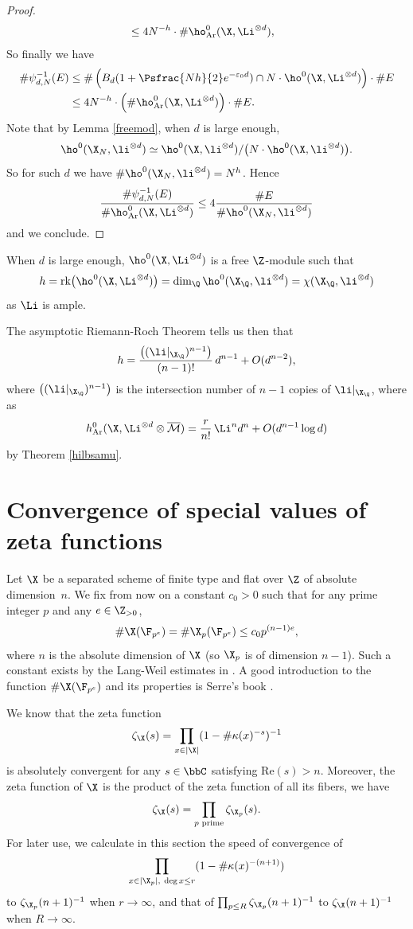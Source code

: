 \begin{proof}[Proof]
\begin{align*}
&\leq 4N^{-h}\cdot \#\ho^0_{\mathrm{Ar}}(\X,\Li^{\otimes d}),
\end{align*}
So finally we have
\begin{align*}
\#\psi_{d,N}^{-1}(E)&\leq \#\left(B_d(1+\Psfrac{Nh}{2}e^{-\varepsilon_0 d}) \cap N\cdot \ho^0(\X,\Li^{\otimes d}) \right)\cdot \#E\\
&\leq 4N^{-h}\cdot \left(\#\ho^0_{\mathrm{Ar}}(\X,\Li^{\otimes d})\right)\cdot \#E.
\end{align*}
Note that by Lemma \ref{freemod}, when $d$ is large enough,
\[
\ho^0(\X_N,\li^{\otimes d})\simeq\ho^0(\X,\li^{\otimes d})/\big(N\cdot \ho^0(\X,\li^{\otimes d})\big).
\]
So for such $d$ we have $\#\ho^0(\X_{N},\li^{\otimes d})=N^{h}$. Hence
\[
\frac{\#\psi_{d,N}^{-1}(E)}{\#\ho^0_{\mathrm{Ar}}(\X,\Li^{\otimes d})}\leq 4\frac{\#E}{\#\ho^0(\X_{N},\li^{\otimes d})}
\]
and we conclude.
\end{proof}

\begin{rmq}
When $d$ is large enough, $\ho^0 (\X,\Li^{\otimes d})$ is a free $\Z$-module such that
\[
h=\mathrm{rk}\big(\ho^0(\X,\Li^{\otimes d})\big)=\dim_{\Q}\ho^0(\X_{\Q},\li^{\otimes d})=\chi(\X_{\Q}, \li^{\otimes d})
\]
as $\Li$ is ample.

The asymptotic Riemann-Roch Theorem tells us then that
\[
h=\frac{\big((\li|_{\X_{\Q}})^{n-1} \big)}{(n-1)!}\, d^{n-1}+O(d^{n-2}),
\]
where $\big((\li|_{\X_{\Q}})^{n-1} \big)$ is the intersection number of $n-1$ copies of $\li |_{\X_\Q}$, where as
\[
h^0_{\mathrm{Ar}}(\X,\Li^{\otimes d}\otimes \overline{\mathcal{M}})= \frac{r}{n!}\,\Li^{n} d^n+O(d^{n-1}\log d)
\]
by Theorem \ref{hilbsamu}.
\end{rmq}

\section{Convergence of special values of zeta functions}\label{c0}
Let $\X$ be a separated scheme of finite type and flat over $\Z$ of absolute dimension~$n$. We fix from now on a constant $c_0>0$ such that for any prime integer $p$ and any $e\in \Z_{>0}$,
\[
\#\X(\F_{p^e})=\#\X_{p}(\F_{p^e})\leq c_0p^{(n-1)e},
\]
where $n$ is the absolute dimension of $\X$ (so $\X_p$ is of dimension $n-1$). Such a constant exists by the Lang-Weil estimates in \cite{LW54}. A good introduction to the function $\#\X(\F_{p^e})$ and its properties is Serre's book \cite{Se12}.

We know that the zeta function
\[
\zeta_{\X}(s)= \prod_{x\in |\X|}(1-\#\kappa(x)^{-s})^{-1}
\]
is absolutely convergent for any $s\in \bbC$ satisfying $\mathrm{Re}(s)>n$. Moreover, the zeta function of $\X$ is the product of the zeta function of all its fibers, \ie we have
\[
\zeta_{\X}(s)=\prod_{p\text{ prime}} \zeta_{\X_p}(s).
\]
For later use, we calculate in this section the speed of convergence of
\[
\prod_{x\in |\X_p|,\ \deg x\leq r}(1-\#\kappa(x)^{-(n+1)})
\]
to $\zeta_{\X_p}(n+1)^{-1}$ when $r\to \infty$, and that of $\prod_{p\leq R} \zeta_{\X_p}(n+1)^{-1}$ to $\zeta_{\X}(n+1)^{-1}$ when $R\to \infty$.

